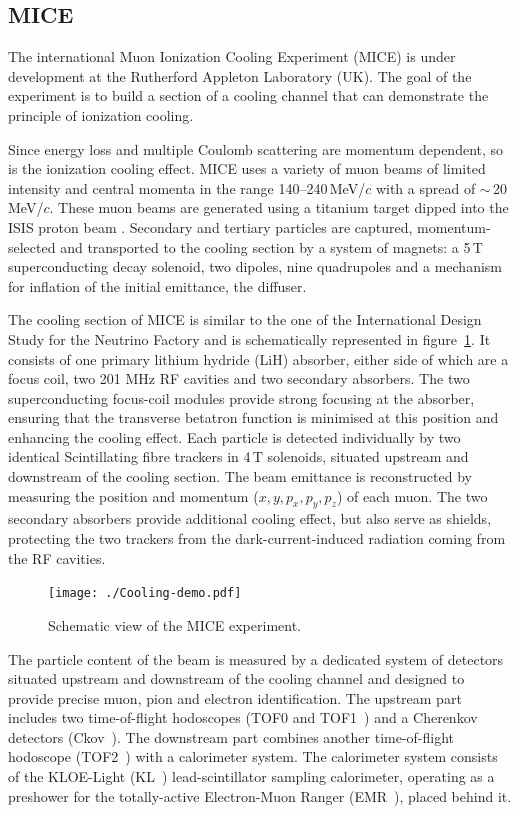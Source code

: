 \documentclass[a4paper,11pt]{article}
\begin{document}
\subsection{MICE}
The international Muon Ionization Cooling Experiment (MICE) \cite{MICEweb} is under development at the Rutherford Appleton Laboratory (UK).
The goal of the experiment is to build a section of a cooling channel that can demonstrate the principle of ionization cooling.

Since energy loss and multiple Coulomb scattering are momentum dependent, so is the ionization cooling effect. MICE uses a variety of muon
beams of limited intensity and central momenta in the range 140--240\,MeV/$c$ with a spread of $\sim$\,20\,MeV/$c$. These muon beams are
generated using a titanium target \cite{target} dipped into the ISIS proton beam \cite{isis}. Secondary and tertiary particles are captured,
momentum-selected and transported to the cooling section by a system of magnets: a 5\,T superconducting decay solenoid, two dipoles, nine
quadrupoles and a mechanism for inflation of the initial emittance, the diffuser.

The cooling section of MICE is similar to the one of the International Design Study for the Neutrino Factory and is schematically represented
in figure~\ref{fig:mice}. It consists of one primary lithium hydride (LiH) absorber, either side of which are a focus coil, two 201 MHz RF
cavities and two secondary absorbers. The two superconducting focus-coil modules provide strong focusing at the absorber, ensuring that the
transverse betatron function is minimised at this position and enhancing the cooling effect. Each particle is detected individually by two
identical Scintillating fibre trackers in 4\,T solenoids, situated upstream and downstream of the cooling section. The beam emittance is
reconstructed by measuring the position and momentum ($x,y,p_x,p_y,p_z$) of each muon. The two secondary absorbers provide additional cooling
effect, but also serve as shields, protecting the two trackers from the dark-current-induced radiation coming from the RF cavities.

\begin{figure}[h]
 \texttt{[image: ./Cooling-demo.pdf]}
 \caption{Schematic view of the MICE experiment.}
 \label{fig:mice}
\end{figure}

The particle content of the beam is measured by a dedicated system of detectors situated upstream and downstream of the cooling channel and
designed to provide precise muon, pion and electron identification. The upstream part includes two time-of-flight hodoscopes (TOF0 and
TOF1~\cite{TOFref}) and a Cherenkov detectors (Ckov~\cite{MICE_PID}). The downstream part combines another time-of-flight hodoscope
(TOF2~\cite{Bertoni:tof2}) with a calorimeter system. The calorimeter system consists of the KLOE-Light (KL~\cite{MICE_PID}) lead-scintillator
sampling calorimeter, operating as a preshower for the totally-active Electron-Muon Ranger (EMR~\cite{ruslan}), placed behind it.
\end{document}
